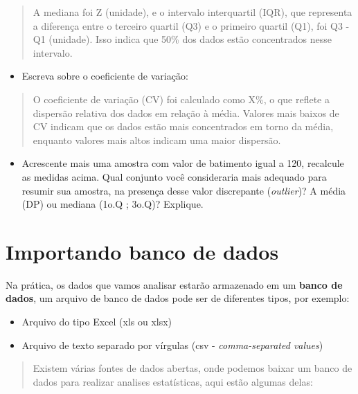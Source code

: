\documentclass[
]{book}
\providecommand{\tightlist}{%
  \setlength{\itemsep}{0pt}\setlength{\parskip}{0pt}}
\begin{document}
\begin{quote}
A mediana foi Z (unidade), e o intervalo interquartil (IQR), que representa a diferença entre o terceiro quartil (Q3) e o primeiro quartil (Q1), foi Q3 - Q1 (unidade). Isso indica que 50\% dos dados estão concentrados nesse intervalo.
\end{quote}

\begin{itemize}
\tightlist
\item
  Escreva sobre o coeficiente de variação:
\end{itemize}

\begin{quote}
O coeficiente de variação (CV) foi calculado como X\%, o que reflete a dispersão relativa dos dados em relação à média. Valores mais baixos de CV indicam que os dados estão mais concentrados em torno da média, enquanto valores mais altos indicam uma maior dispersão.
\end{quote}

\begin{itemize}
\tightlist
\item
  Acrescente mais uma amostra com valor de batimento igual a 120, recalcule as medidas acima. Qual conjunto você consideraria mais adequado para resumir sua amostra, na presença desse valor discrepante (\emph{outlier})? A média (DP) ou mediana (1o.Q ; 3o.Q)? Explique.
\end{itemize}

\chapter{Importando banco de dados}\label{importando-banco-de-dados}

Na prática, os dados que vamos analisar estarão armazenado em um \textbf{banco de dados}, um arquivo de banco de dados pode ser de diferentes tipos, por exemplo:

\begin{itemize}
\item
  Arquivo do tipo Excel (xls ou xlsx)
\item
  Arquivo de texto separado por vírgulas (csv - \emph{comma-separated values})
\end{itemize}

\begin{quote}
Existem várias fontes de dados abertas, onde podemos baixar um banco de dados para realizar analises estatísticas, aqui estão algumas delas:
\end{quote}
\end{document}
